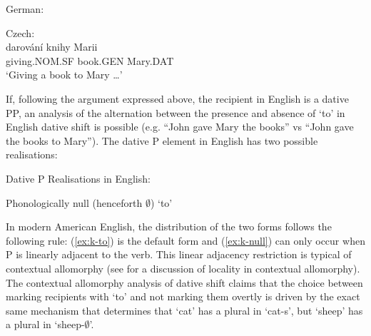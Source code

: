 	\begin{exe}
		\ex German:\label{german-nom}\\
		\begin{xlist}

		\end{xlist}
		\ex Czech:\label{czech-nom}\\
		\gll darov\'{a}n\'{i} knihy Marii\\
		giving.NOM.SF book.GEN Mary.DAT\\
		\trans `Giving a book to Mary \ldots \citep[ex. 14]{Dvorak.2009}'
	\end{exe}

	If, following the argument expressed above, the recipient in English is a dative PP, an analysis of the alternation between the presence and absence of `to' in English dative shift is possible (e.g. ``John gave Mary the books'' vs ``John gave the books to Mary''). The dative P element in English has two possible realisations:

	\begin{exe}
		\ex Dative P Realisations in English:
		\begin{xlist}
			\ex Phonologically null\label{ex:k-null} (henceforth $\emptyset$)
			\ex `to'\label{ex:k-to}
		\end{xlist}
	\end{exe}
	In modern American English, the distribution of the two forms follows the following rule: (\ref{ex:k-to}) is the default form and (\ref{ex:k-null}) can only occur when P is linearly adjacent to the verb. This linear adjacency restriction is typical of contextual allomorphy (see \citet{Embick.2010} for a discussion of locality in contextual allomorphy). The contextual allomorphy analysis of dative shift claims that the choice between marking recipients with `to' and not marking them overtly is driven by the exact same mechanism that determines that `cat' has a plural in `cat-s', but `sheep' has a plural in `sheep-$\emptyset$'.

